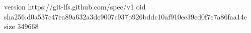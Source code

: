 version https://git-lfs.github.com/spec/v1
oid sha256:d0a537c47ea89a632a3dc9007c937b926bddc10af910ee39cd0f7c7a86faa14c
size 349668
